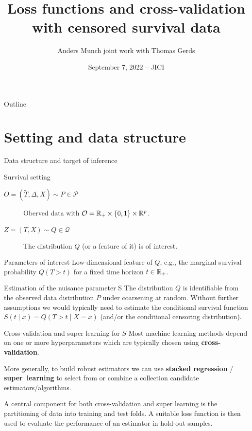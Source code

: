 \documentclass[smaller]{beamer}\usepackage{listings}
\institute{PhD Student, Section of Biostatistics \\ University of Copenhagen}
\author{Anders Munch \newline \small joint work with Thomas Gerds}
\date{September 7, 2022 -- JICI}
\title{Loss functions and cross-validation with censored survival data}
\begin{document}
\maketitle
\begin{frame}{Outline}
\tableofcontents
\end{frame}

\section{Setting and data structure}
\label{sec:org108f2e3}
\begin{frame}[label={sec:org240f6cc}]{Data structure and target of inference}
\small
\begin{block}{Survival setting}
\begin{description}
\item[{\(O = (\tilde T, \Delta, X) \sim P \in \mathcal{P}\)}] Oberved data with \(\mathcal{O} = \mathbb{R}_+
  \times \{0,1\} \times \mathbb{R}^p\).
\item[{\(Z = (T, X) \sim Q \in \mathcal{Q}\)}] The distribution \(Q\) (or a feature of it) is of interest.
\end{description}

\hfill \pause
\end{block}

\begin{block}{Parameters of interest}
Low-dimensional feature of \(Q\), e.g., the marginal survival probability \(Q(T > t)\) for a fixed
time horizon \(t \in \mathbb{R}_+\).

\hfill 
\end{block}


\begin{block}{Estimation of the nuisance parameter S}
The distribution \(Q\) is identifiable from the observed data distribution \(P\) under coarsening at
random. Without further assumptions we would typically need to estimate the conditional survival
function \(S(t \mid x) = Q(T > t \mid X=x)\) (and/or the conditional censoring distribution).
\end{block}
\end{frame}

\begin{frame}[label={sec:org2ec45d2}]{Cross-validation and super learning for \(S\)}
\pause Most machine learning methods depend on one or more hyperparameters which are typically
chosen using \textbf{cross-validation}.

\vfill

More generally, to build robust estimators we can use \textbf{stacked regression} /
\textbf{super~learning} \citep{breiman1996stacked,van2007super} to select from or combine a
collection candidate estimators/algorithms.

\vfill

A central component for both cross-validation and super learning is the partitioning of data into
training and test folds. A suitable loss function is then used to evaluate the performance of an
estimator in hold-out samples.
\end{frame}
\end{document}
